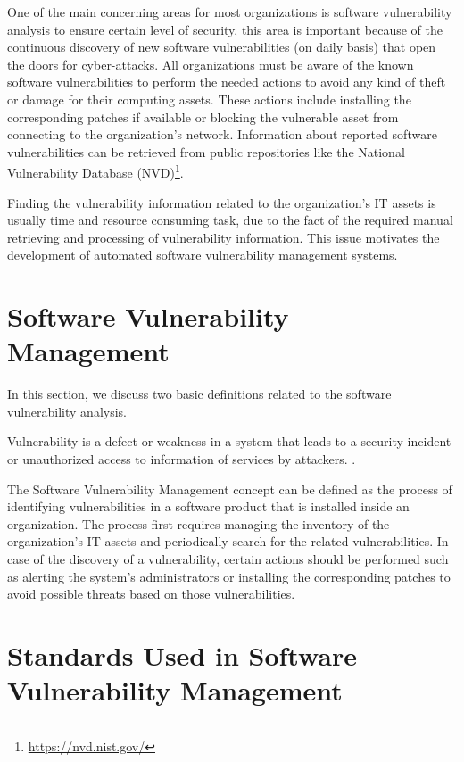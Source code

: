 \documentclass{llncs}
\begin{document}
\par One of the main concerning areas for most organizations is software vulnerability analysis to ensure certain level of security, this area is important because of the continuous discovery of new software vulnerabilities (on daily basis) that open the doors for cyber-attacks. All organizations must be aware of the known software vulnerabilities to perform the needed actions to avoid any kind of theft or damage for their computing assets. These actions include installing the corresponding patches if available or blocking the vulnerable asset from connecting to the organization's network. Information about reported software vulnerabilities can be retrieved from public repositories like the National Vulnerability Database (NVD)\footnote{\url{https://nvd.nist.gov/}}. 
\par Finding the vulnerability information related to the organization's IT assets is usually time and resource consuming task, due to the fact of the required manual retrieving and processing of vulnerability information. This issue motivates the development of automated software vulnerability management systems. 
 
       
\section{Software Vulnerability Management}

In this section, we discuss two basic definitions related to the software vulnerability analysis.
\par Vulnerability is a defect or weakness in a system that leads to a security incident or unauthorized access to information of services by attackers. \cite{vuln}.  

\par The Software Vulnerability Management concept can be defined as the process of identifying vulnerabilities in a software product that is installed inside an organization. The process first requires managing the inventory of the organization's IT assets and  periodically search for the related vulnerabilities. In case of the discovery of a vulnerability, certain actions should be performed such as alerting the system's administrators or installing the corresponding patches to avoid possible threats based on those vulnerabilities. 

\newpage
\section{Standards	Used	in	Software	Vulnerability	Management}
 
\end{document}
